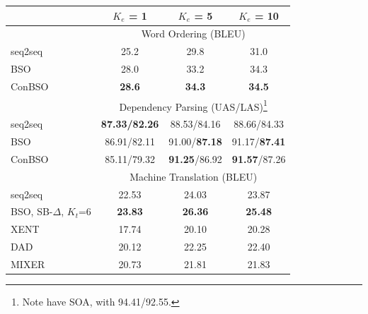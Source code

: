 \documentclass{beamer}
\begin{document}
\begin{frame}
  \vspace{-0.2cm}
  \begin{table}
  \centering
    \small
  \begin{tabular}{lccc}
    \toprule
    & $K_e$ = 1 & $K_e$ = 5 & $K_e$ = 10 \\ 
    \midrule
     & \multicolumn{3}{c}{Word Ordering (BLEU) } \\ 
    \midrule
    seq2seq & 25.2 & 29.8 & 31.0 \\
    BSO     & 28.0 & 33.2 & 34.3 \\
    ConBSO & \textbf{28.6} & \textbf{34.3} & \textbf{34.5} \\
    \midrule


    & \multicolumn{3}{c}{Dependency Parsing (UAS/LAS)\footnote{Note \citet{Andor2016} have SOA, with 94.41/92.55.} } \\ 
    seq2seq & \textbf{87.33/82.26} & 88.53/84.16 & 88.66/84.33\\
    BSO & 86.91/82.11 & 91.00/\textbf{87.18} & 91.17/\textbf{87.41} \\
    ConBSO & 85.11/79.32 & \textbf{91.25}/86.92 & \textbf{91.57}/87.26 \\

    \midrule
    & \multicolumn{3}{c}{Machine Translation (BLEU) } \\ 
    seq2seq & 22.53 & 24.03 & 23.87 \\
    BSO, SB-$\Delta$, $K_t$=6 & \textbf{23.83} & \textbf{26.36} & \textbf{25.48} \\
    XENT & 17.74 & 20.10 & 20.28 \\
    DAD & 20.12 & 22.25 & 22.40 \\ 
    MIXER & 20.73 & 21.81 & 21.83 \\    
    \bottomrule
  \end{tabular}
  \label{tab:mtfinal}
\end{table}

\end{frame}
\end{document}
